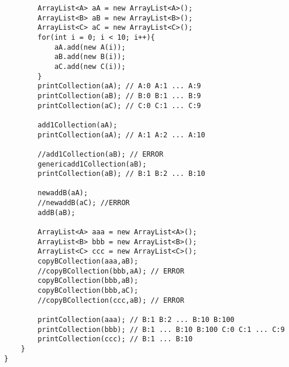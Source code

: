\documentclass[10pt]{article}
\begin{document}
\begin{verbatim}
        ArrayList<A> aA = new ArrayList<A>();
        ArrayList<B> aB = new ArrayList<B>();
        ArrayList<C> aC = new ArrayList<C>();
        for(int i = 0; i < 10; i++){
            aA.add(new A(i));
            aB.add(new B(i));
            aC.add(new C(i));
        }
        printCollection(aA); // A:0 A:1 ... A:9
        printCollection(aB); // B:0 B:1 ... B:9
        printCollection(aC); // C:0 C:1 ... C:9

        add1Collection(aA);
        printCollection(aA); // A:1 A:2 ... A:10

        //add1Collection(aB); // ERROR
        genericadd1Collection(aB);
        printCollection(aB); // B:1 B:2 ... B:10
    
        newaddB(aA);
        //newaddB(aC); //ERROR
        addB(aB);
        
        ArrayList<A> aaa = new ArrayList<A>();
        ArrayList<B> bbb = new ArrayList<B>();
        ArrayList<C> ccc = new ArrayList<C>();
        copyBCollection(aaa,aB);
        //copyBCollection(bbb,aA); // ERROR
        copyBCollection(bbb,aB);
        copyBCollection(bbb,aC);
        //copyBCollection(ccc,aB); // ERROR

        printCollection(aaa); // B:1 B:2 ... B:10 B:100
        printCollection(bbb); // B:1 ... B:10 B:100 C:0 C:1 ... C:9
        printCollection(ccc); // B:1 ... B:10
    }
}
\end{verbatim}
\end{document}
